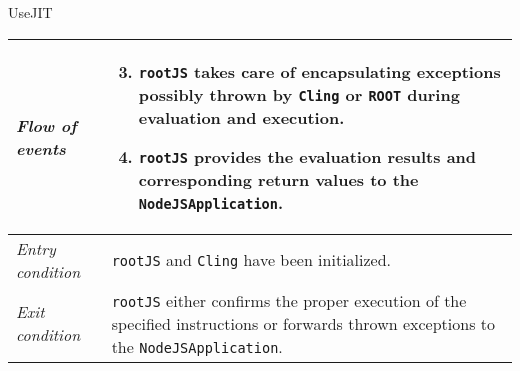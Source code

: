 \begin{frame}[t]{UseJIT}
        \begin{longtable}{p{3cm} @{\hskip 1cm} p{7cm}}
                \textit{Flow of events} &
                        \begin{enumerate}
                                \setcounter{enumi}{2}
                                \pause

                                \item \texttt{rootJS} takes care of encapsulating exceptions possibly thrown by \texttt{Cling} or \texttt{ROOT} during evaluation and execution.
                                \pause

                                \item \texttt{rootJS} provides the evaluation results and corresponding return values to the \texttt{NodeJSApplication}.
                        \end{enumerate}
                        \\
                \hline
                \pause

                \textit{Entry condition} & \texttt{rootJS} and \texttt{Cling} have been initialized.\\
                \hline

                \textit{Exit condition} & \texttt{rootJS} either confirms the proper execution of the specified instructions or forwards thrown exceptions to the \texttt{NodeJSApplication}.\\
                \hline
        \end{longtable}
\end{frame}
